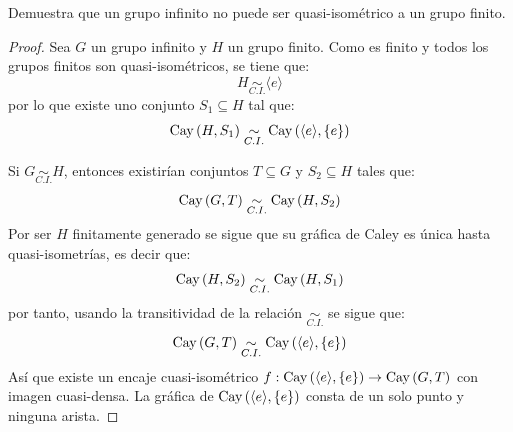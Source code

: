 \documentclass[12pt]{report}
\newcounter{it}
\theoremstyle{largebreak}
\newcommand\cf[3]{\ensuremath{#1:#2\rightarrow#3}}
\newcommand{\Cay}[1]{\ensuremath{\textup{Cay}\left(#1\right)}}
\newcommand{\gen}[1]{\ensuremath{\langle#1\rangle}}
\newcommand{\qisom}{\ensuremath{\underset{C.I.}{\sim}}}
\begin{document}
    \begin{excer}
        Demuestra que un grupo infinito no puede ser quasi-isométrico a un grupo finito.
    \end{excer}

    \begin{proof}
        Sea $G$ un grupo infinito y $H$ un grupo finito. Como es finito y todos los grupos finitos son quasi-isométricos, se tiene que:
        \begin{equation*}
            H\qisom\gen{e}
        \end{equation*}
        por lo que existe uno conjunto $S_1\subseteq H$ tal que:
        \begin{equation*}
            \Cay{H,S_1}\qisom\Cay{\gen{e},\left\{e\right\}}
        \end{equation*}

        Si $G\qisom H$, entonces existirían conjuntos $T\subseteq G$ y $S_2\subseteq H$ tales que:
        \begin{equation*}
            \Cay{G,T}\qisom\Cay{H,S_2}
        \end{equation*}
        Por ser $H$ finitamente generado se sigue que su gráfica de Caley es única hasta quasi-isometrías, es decir que:
        \begin{equation*}
            \Cay{H,S_2}\qisom \Cay{H,S_1}
        \end{equation*}
        por tanto, usando la transitividad de la relación $\qisom$ se sigue que:
        \begin{equation*}
            \Cay{G,T}\qisom\Cay{\gen{e},\left\{e\right\}}
        \end{equation*}
        Así que existe un encaje cuasi-isométrico $\cf{f}{\Cay{\gen{e},\left\{e\right\}}}{\Cay{G,T}}$ con imagen cuasi-densa. La gráfica de $\Cay{\gen{e},\left\{e\right\}}$ consta de un solo punto y ninguna arista.


\end{proof}
\end{document}
